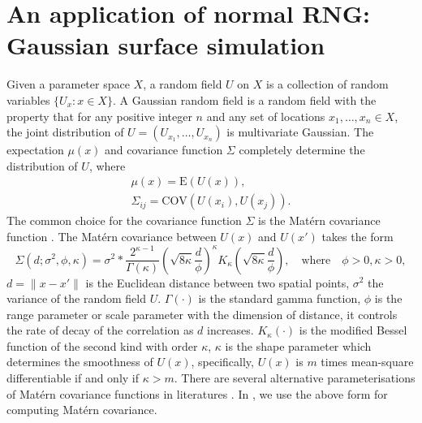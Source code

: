 \documentclass[article,nojss]{jss}\usepackage[]{graphicx}\usepackage[]{color}
\def\cov{{\text{COV}}}
\def\E{{\text{E}}}
\begin{document}
\section{An application of normal RNG: Gaussian surface simulation} 
Given a parameter space $X$, a random field $U$ on $X$ is a collection of random variables $\{U_x :x\in X\}$. A Gaussian random field is a random field with the property that for any positive integer $n$ and any set of locations $x_1,\dots,x_n \in X$, the joint distribution of $U=(U_{x_1},\dots,U_{x_n})$ is multivariate Gaussian. The expectation $\mu(x)$ and covariance function $\Sigma$ completely determine the distribution of $U$, where 
\begin{gather*} 
\mu(x) = \E (U(x)),\\
\Sigma_{ij} = \cov (U(x_i),U(x_j)).
\end{gather*}
The common choice for the covariance function $\Sigma$ is the Mat\'ern covariance function \citep{matern1960spatial}. The Mat\'ern covariance between $U(x)$ and $U(x')$ takes the form 
\begin{equation*}
\Sigma(d;\sigma^2,\phi,\kappa)=\sigma^2*\frac{2^{\kappa-1}}{\Gamma(\kappa)} (\sqrt{8\kappa} \frac{d}{\phi})^\kappa  K_\kappa(\sqrt{8\kappa}  \frac{d}{\phi}),  \quad \text{where} \quad \phi> 0,  \kappa > 0,
\end{equation*} 
$d =\|x-x'\|$ is the Euclidean distance between two spatial points, 
$\sigma^2$ the variance of the random field $U$.
$\Gamma(\cdot)$ is the standard gamma function,  $\phi$ is the range parameter or scale parameter with the dimension of distance, it controls the rate of decay of the correlation as $d$ increases. $K_\kappa(\cdot)$ is the modified Bessel function of the second kind with order $\kappa$, $\kappa$ is the shape parameter which determines the smoothness of $U(x)$, specifically, $U(x)$ is $m$ times mean-square differentiable if and only if $\kappa > m$. %
There are several alternative parameterisations of Mat\'ern covariance functions in literatures  \citep[see][]{haskard2007anisotropic}. In , we use the above form for computing Mat\'ern covariance.
\end{document}
